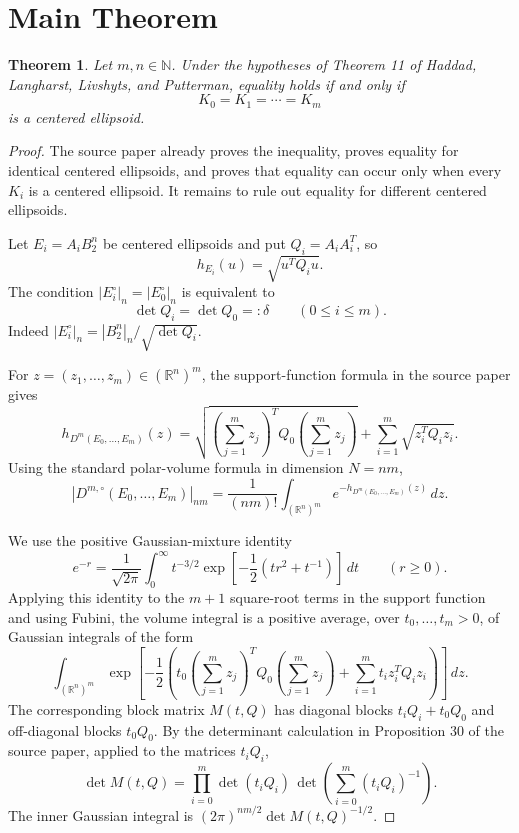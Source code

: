 \documentclass[11pt]{amsart}
\newtheorem{theorem}{Theorem}
\newcommand{\R}{\mathbb R}
\newcommand{\B}{B_2^n}
\newcommand{\voln}[1]{|#1|_n}
\newcommand{\volnm}[1]{|#1|_{nm}}
\begin{document}
\section*{Main Theorem}

\begin{theorem}
Let \(m,n\in\mathbb N\).  Under the hypotheses of Theorem 11 of Haddad,
Langharst, Livshyts, and Putterman, equality holds if and only if
\[
  K_0=K_1=\cdots=K_m
\]
is a centered ellipsoid.
\end{theorem}

\begin{proof}
The source paper already proves the inequality, proves equality for identical
centered ellipsoids, and proves that equality can occur only when every
\(K_i\) is a centered ellipsoid.  It remains to rule out equality for different
centered ellipsoids.

Let \(E_i=A_i\B\) be centered ellipsoids and put \(Q_i=A_iA_i^T\), so
\[
  h_{E_i}(u)=\sqrt{u^TQ_i u}.
\]
The condition \(\voln{E_i^\circ}=\voln{E_0^\circ}\) is equivalent to
\[
  \det Q_i=\det Q_0=:\delta
  \qquad(0\leq i\leq m).
\]
Indeed \(\voln{E_i^\circ}=\voln{\B}/\sqrt{\det Q_i}\).

For \(z=(z_1,\ldots,z_m)\in(\R^n)^m\), the support-function formula in the
source paper gives
\[
  h_{D^m(E_0,\ldots,E_m)}(z)
  =
  \sqrt{\left(\sum_{j=1}^mz_j\right)^TQ_0\left(\sum_{j=1}^mz_j\right)}
  +
  \sum_{i=1}^m\sqrt{z_i^TQ_i z_i}.
\]
Using the standard polar-volume formula in dimension \(N=nm\),
\[
  \volnm{D^{m,\circ}(E_0,\ldots,E_m)}
  =
  \frac{1}{(nm)!}
  \int_{(\R^n)^m}e^{-h_{D^m(E_0,\ldots,E_m)}(z)}\,dz.
\]

We use the positive Gaussian-mixture identity
\[
  e^{-r}
  =
  \frac{1}{\sqrt{2\pi}}
  \int_0^\infty
    t^{-3/2}\exp\left[-\frac12\left(tr^2+t^{-1}\right)\right]\,dt
  \qquad(r\geq0).
\]
Applying this identity to the \(m+1\) square-root terms in the support function
and using Fubini, the volume integral is a positive average, over
\(t_0,\ldots,t_m>0\), of Gaussian integrals of the form
\[
  \int_{(\R^n)^m}
  \exp\left[
    -\frac12\left(
      t_0\left(\sum_{j=1}^mz_j\right)^TQ_0\left(\sum_{j=1}^mz_j\right)
      +\sum_{i=1}^m t_i z_i^TQ_i z_i
    \right)
  \right]\,dz.
\]
The corresponding block matrix \(M(t,Q)\) has diagonal blocks
\(t_iQ_i+t_0Q_0\) and off-diagonal blocks \(t_0Q_0\).  By the determinant
calculation in Proposition 30 of the source paper, applied to the matrices
\(t_iQ_i\),
\[
  \det M(t,Q)
  =
  \prod_{i=0}^m\det(t_iQ_i)\,
  \det\left(\sum_{i=0}^m(t_iQ_i)^{-1}\right).
\]
The inner Gaussian integral is \((2\pi)^{nm/2}\det M(t,Q)^{-1/2}\).


\end{proof}
\end{document}
